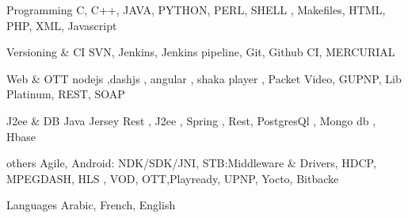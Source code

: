 


\begin{cvskills}


\cvskill
{Programming} %
{C, C++, JAVA, PYTHON, PERL, SHELL , Makefiles, HTML, PHP, XML, Javascript  }%

\cvskill
{Versioning \& CI}
{ SVN, Jenkins, Jenkins pipeline, Git, Github CI, MERCURIAL }

\cvskill
{Web \& OTT} %
{nodejs ,dashjs , angular , shaka player ,  Packet Video, GUPNP, Lib Platinum, REST, SOAP }%

\cvskill
{J2ee \& DB} %
{Java Jersey Rest , J2ee , Spring , Rest, PostgresQl , Mongo db , Hbase} %

\cvskill
{others}
{ Agile, Android: NDK/SDK/JNI, STB:Middleware \& Drivers, HDCP, MPEGDASH, HLS , VOD, OTT,Playready, UPNP, Yocto, Bitbacke}

\cvskill
{Languages} %
{Arabic, French, English} %


\end{cvskills}
